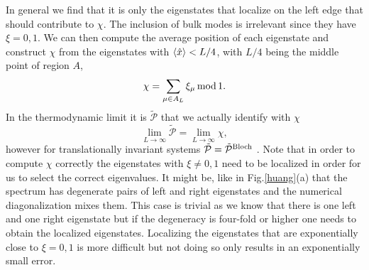 \documentclass[twocolumn,amsmath,longbibliography,amssymb,superscriptaddress]{revtex4-1}
\begin{document}
In general we find that it is only the eigenstates that localize on the left edge that should contribute to $\chi$. The inclusion of bulk modes is irrelevant since they have $\xi = 0,1$. We can then compute the average position of each eigenstate and construct $\chi$ from the eigenstates with $\expval{\hat{x}}<L/4$, with $L/4$ being the middle point of region $A$,
\begin{equation}
\chi = \sum_{\mu \in A_L} \xi_\mu \, {\rm mod} \, 1. 
\label{eq:chi_left}
\end{equation}
In the thermodynamic limit it is $\tilde{\mathcal{P}}$ that we actually identify with $\chi$
\begin{equation}
\lim_{L \rightarrow \infty} \tilde{\mathcal{P}} = \lim_{L \rightarrow \infty} \chi,
\label{eq:ptilde_eq_chi}
\end{equation}
however for translationally invariant systems $\tilde{\mathcal{P}} = \tilde{\mathcal{P}}^{\rm Bloch}$ \cite{Watanabe2018}. Note that in order to compute $\chi$ correctly the eigenstates with $\xi \neq 0,1$ need to be localized in order for us to select the correct eigenvalues. It might be, like in Fig.\ref{huang}(a) that the spectrum has degenerate pairs of left and right eigenstates and the numerical diagonalization mixes them. This case is trivial as we know that there is one left and one right eigenstate but if the degeneracy is four-fold or higher one needs to obtain the localized eigenstates. Localizing the eigenstates that are exponentially close to $\xi = 0,1$ is more difficult but not doing so only results in an exponentially small error. 
\end{document}
